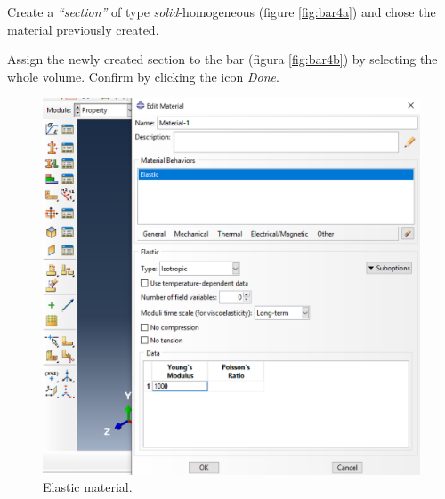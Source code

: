 \documentclass[spanish,a4paper,12pt]{article}
\begin{document}
Create a \emph{``section''} of type \emph{solid}-homogeneous (figure \ref{fig:bar4a}) and chose the material previously created.

Assign the newly created section to the bar (figura \ref{fig:bar4b}) by selecting the whole volume. Confirm by clicking the icon \emph{Done}.
\begin{figure}[h!tp]
\centering
\includegraphics[scale=0.4]{capturas/prop0.png}
\caption{Elastic material.}
\label{fig:bar3}
\end{figure}
\end{document}
